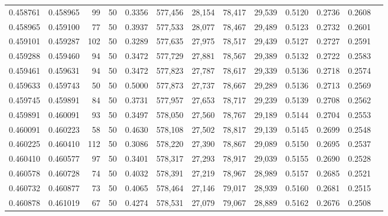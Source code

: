\begin{tabular}{rrrrrrrrrrrrr}
0.458761 & 0.458965 &    99 &  50 &                                     0.3356 & 577,456 &  28,154 &  78,417 &  29,539 & 0.5120 & 0.2736 & 0.2608 \\
0.458965 & 0.459100 &    77 &  50 &                                     0.3937 & 577,533 &  28,077 &  78,467 &  29,489 & 0.5123 & 0.2732 & 0.2601 \\
0.459101 & 0.459287 &   102 &  50 &                                     0.3289 & 577,635 &  27,975 &  78,517 &  29,439 & 0.5127 & 0.2727 & 0.2591 \\
0.459288 & 0.459460 &    94 &  50 &                                     0.3472 & 577,729 &  27,881 &  78,567 &  29,389 & 0.5132 & 0.2722 & 0.2583 \\
0.459461 & 0.459631 &    94 &  50 &                                     0.3472 & 577,823 &  27,787 &  78,617 &  29,339 & 0.5136 & 0.2718 & 0.2574 \\
0.459633 & 0.459743 &    50 &  50 &                                     0.5000 & 577,873 &  27,737 &  78,667 &  29,289 & 0.5136 & 0.2713 & 0.2569 \\
0.459745 & 0.459891 &    84 &  50 &                                     0.3731 & 577,957 &  27,653 &  78,717 &  29,239 & 0.5139 & 0.2708 & 0.2562 \\
0.459891 & 0.460091 &    93 &  50 &                                     0.3497 & 578,050 &  27,560 &  78,767 &  29,189 & 0.5144 & 0.2704 & 0.2553 \\
0.460091 & 0.460223 &    58 &  50 &                                     0.4630 & 578,108 &  27,502 &  78,817 &  29,139 & 0.5145 & 0.2699 & 0.2548 \\
0.460225 & 0.460410 &   112 &  50 &                                     0.3086 & 578,220 &  27,390 &  78,867 &  29,089 & 0.5150 & 0.2695 & 0.2537 \\
0.460410 & 0.460577 &    97 &  50 &                                     0.3401 & 578,317 &  27,293 &  78,917 &  29,039 & 0.5155 & 0.2690 & 0.2528 \\
0.460578 & 0.460728 &    74 &  50 &                                     0.4032 & 578,391 &  27,219 &  78,967 &  28,989 & 0.5157 & 0.2685 & 0.2521 \\
0.460732 & 0.460877 &    73 &  50 &                                     0.4065 & 578,464 &  27,146 &  79,017 &  28,939 & 0.5160 & 0.2681 & 0.2515 \\
0.460878 & 0.461019 &    67 &  50 &                                     0.4274 & 578,531 &  27,079 &  79,067 &  28,889 & 0.5162 & 0.2676 & 0.2508 \\

\end{tabular}
